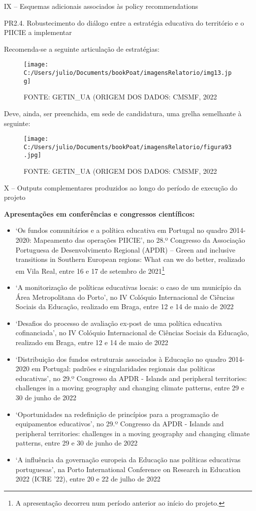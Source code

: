 \documentclass[
]{book}
\begin{document}
IX -- Esquemas adicionais associados às policy recommendations

\leavevmode{}%
PR2.4. Robustecimento do diálogo entre a estratégia educativa do território e o PIICIE a implementar

Recomenda-se a seguinte articulação de estratégias:

\begin{figure}
\centering
\texttt{[image: C:/Users/julio/Documents/bookPoat/imagensRelatorio/img13.jpg]}
\caption{FONTE: GETIN\_UA (ORIGEM DOS DADOS: CMSMF, 2022}
\end{figure}

Deve, ainda, ser preenchida, em sede de candidatura, uma grelha semelhante à seguinte:

\begin{figure}
\centering
\texttt{[image: C:/Users/julio/Documents/bookPoat/imagensRelatorio/figura93.jpg]}
\caption{FONTE: GETIN\_UA (ORIGEM DOS DADOS: CMSMF, 2022}
\end{figure}

X -- Outputs complementares produzidos ao longo do período de execução do projeto

\textbf{Apresentações em conferências e congressos científicos:}

\begin{itemize}
\item
  `Os fundos comunitários e a política educativa em Portugal no quadro 2014-2020: Mapeamento das operações PIICIE', no 28.º Congresso da Associação Portuguesa de Desenvolvimento Regional (APDR) -- Green and inclusive transitions in Southern European regions: What can we do better, realizado em Vila Real, entre 16 e 17 de setembro de 2021\footnote{A apresentação decorreu num período anterior ao início do projeto.}
\item
  `A monitorização de políticas educativas locais: o caso de um município da Área Metropolitana do Porto', no IV Colóquio Internacional de Ciências Sociais da Educação, realizado em Braga, entre 12 e 14 de maio de 2022
\item
  `Desafios do processo de avaliação ex-post de uma política educativa cofinanciada', no IV Colóquio Internacional de Ciências Sociais da Educação, realizado em Braga, entre 12 e 14 de maio de 2022
\item
  `Distribuição dos fundos estruturais associados à Educação no quadro 2014-2020 em Portugal: padrões e singularidades regionais das políticas educativas', no 29.º Congresso da APDR - Islands and peripheral territories: challenges in a moving geography and changing climate patterns, entre 29 e 30 de junho de 2022
\item
  `Oportunidades na redefinição de princípios para a programação de equipamentos educativos', no 29.º Congresso da APDR - Islands and peripheral territories: challenges in a moving geography and changing climate patterns, entre 29 e 30 de junho de 2022
\item
  `A influência da governação europeia da Educação nas políticas educativas portuguesas', na Porto International Conference on Research in Education 2022 (ICRE '22), entre 20 e 22 de julho de 2022
\end{itemize}
\end{document}
